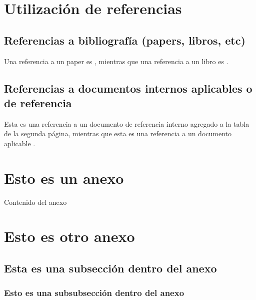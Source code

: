 \documentclass{GVT_CONAE_Class}
\begin{document}
\section{Utilización de referencias}

\subsection{Referencias a bibliografía (papers, libros, etc)}

Una referencia a un paper es \cite{Jablonski2016}, mientras que una referencia a un libro es \cite{ModernOpticalEngineering}.

\subsection{Referencias a documentos internos aplicables o de referencia}

Esta es una referencia a un documento de referencia  interno agregado a la tabla de la segunda página, mientras que esta es una referencia a un documento aplicable .




\newpage %
\appendix
\section{Esto es un anexo}

Contenido del anexo

\section{Esto es otro anexo}

\subsection{Esta es una subsección dentro del anexo}

\subsubsection{Esto es una subsubsección dentro del anexo}



\end{document}
